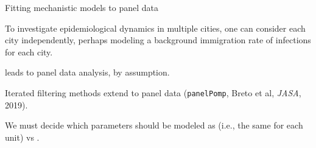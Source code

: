 \documentclass{beamer}
\begin{document}
\begin{frame}{Fitting mechanistic models to panel data}

\bi
\item To investigate epidemiological dynamics in multiple cities, one can consider each city independently, perhaps modeling a background immigration rate of infections for each city.

  \vspace{2mm}
  
\item {} leads to panel data analysis, by assumption.

  \vspace{2mm}
  
  \item Iterated filtering methods extend to panel data (\texttt{panelPomp}, Breto et al, {\it JASA}, 2019).

    \vspace{2mm}
    
\item We must decide which parameters should be modeled as  (i.e., the same for each unit) vs .


  \ei

  \end{frame}
\end{document}
